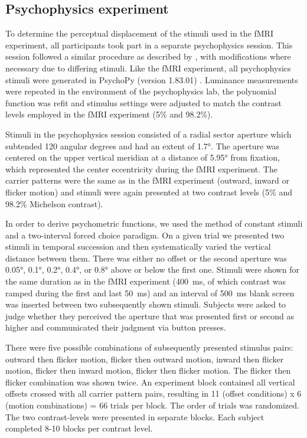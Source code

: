 \subsection{Psychophysics experiment}
To determine the perceptual displacement of the stimuli used in the fMRI experiment, all participants took part in a separate psychophysics session. This session followed a similar procedure as described by \cite{Harvey2016}, with modifications where necessary due to differing stimuli. Like the fMRI experiment, all psychophysics stimuli were generated in PsychoPy (version 1.83.01) \parencite{Peirce2007,Peirce2008}. Luminance measurements were repeated in the environment of the psychophysics lab, the polynomial function was refit and stimulus settings were adjusted to match the contrast levels employed in the fMRI experiment (5\% and 98.2\%).

Stimuli in the psychophysics session consisted of a radial sector aperture which subtended 120 angular degrees and had an extent of 1.7°. The aperture was centered on the upper vertical meridian at a distance of 5.95° from fixation, which represented the center eccentricity during the fMRI experiment. The carrier patterns were the same as in the fMRI experiment (outward, inward or flicker motion) and stimuli were again presented at two contrast levels (5\% and 98.2\% Michelson contrast).

In order to derive psychometric functions, we used the method of constant stimuli and a two-interval forced choice paradigm. On a given trial we presented two stimuli in temporal succession and then systematically varied the vertical distance between them. There was either no offset or the second aperture was 0.05°, 0.1°, 0.2°, 0.4°, or 0.8° above or below the first one. Stimuli were shown for the same duration as in the fMRI experiment (400~ms, of which contrast was ramped during the first and last 50~ms) and an interval of 500~ms blank screen was inserted between two subsequently shown stimuli. Subjects were asked to judge whether they perceived the aperture that was presented first or second as higher and communicated their judgment via button presses.

There were five possible combinations of subsequently presented stimulus pairs: outward then flicker motion, flicker then outward motion, inward then flicker motion, flicker then inward motion, flicker then flicker motion. The flicker then flicker combination was shown twice. An experiment block contained all vertical offsets crossed with all carrier pattern pairs, resulting in 11 (offset conditions) x 6 (motion combinations) = 66 trials per block. The order of trials was randomized. The two contrast-levels were presented in separate blocks. Each subject completed 8-10 blocks per contrast level.

